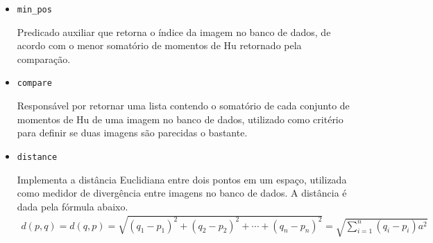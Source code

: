 \documentclass{../sftex/sftex}
\begin{document}
\begin{itemize}
\item \verb!min_pos!

Predicado auxiliar que retorna o índice da imagem no banco de dados, de acordo
com o menor somatório de momentos de Hu retornado pela comparação.

\item \verb!compare!

Responsável por retornar uma lista contendo o somatório de cada conjunto de
momentos de Hu de uma imagem no banco de dados, utilizado como critério para
definir se duas imagens são parecidas o bastante.

\item \verb!distance!

Implementa a distância Euclidiana entre dois pontos em um espaço, utilizada
como medidor de divergência entre imagens no banco de dados. A distância é dada
pela fórmula abaixo.
\begin{gather*}
d(p,q) = d(q,p)
    = \sqrt{{(q_1 - p_1)}^2 + {(q_2 - p_2)}^2 + \cdots + {(q_n - p_n)}^2}
    = \sqrt{\sum\limits_{i=1}^{n} {(q_i - p_i)}a^2}
\end{gather*}

\end{itemize}
\end{document}
